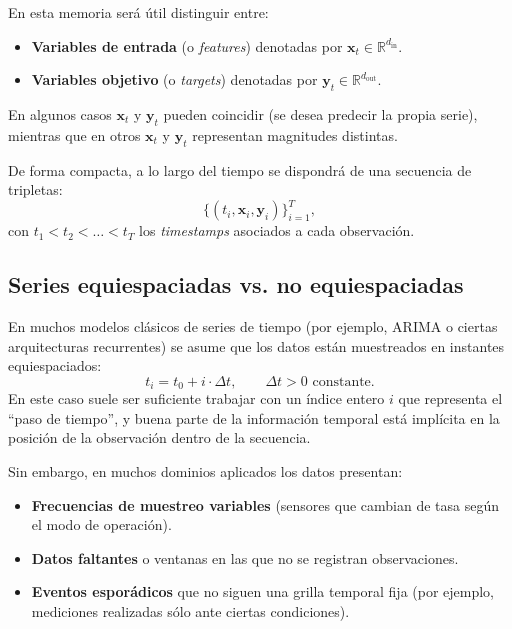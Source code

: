 \hfill

En esta memoria será útil distinguir entre:
\begin{itemize}
    \item \textbf{Variables de entrada} (o \emph{features}) denotadas por $\mathbf{x}_t \in \mathbb{R}^{d_{\text{in}}}$.
    \item \textbf{Variables objetivo} (o \emph{targets}) denotadas por $\mathbf{y}_t \in \mathbb{R}^{d_{\text{out}}}$.
\end{itemize}
En algunos casos $\mathbf{x}_t$ y $\mathbf{y}_t$ pueden coincidir (se desea predecir la propia serie), mientras que en otros $\mathbf{x}_t$ y $\mathbf{y}_t$ representan magnitudes distintas.

\hfill

De forma compacta, a lo largo del tiempo se dispondrá de una secuencia de tripletas:
\begin{equation}
    \{(t_i, \mathbf{x}_i, \mathbf{y}_i)\}_{i=1}^{T},
\end{equation}
con $t_1 < t_2 < \dots < t_T$ los \emph{timestamps} asociados a cada observación.

\subsection{Series equiespaciadas vs. no equiespaciadas}

En muchos modelos clásicos de series de tiempo (por ejemplo, ARIMA o ciertas arquitecturas recurrentes) se asume que los datos están muestreados en instantes equiespaciados:
\begin{equation}
    t_i = t_0 + i \cdot \Delta t, \qquad \Delta t > 0 \text{ constante}.
\end{equation}
En este caso suele ser suficiente trabajar con un índice entero $i$ que representa el ``paso de tiempo'', y buena parte de la información temporal está implícita en la posición de la observación dentro de la secuencia.

\hfill

Sin embargo, en muchos dominios aplicados los datos presentan:
\begin{itemize}
    \item \textbf{Frecuencias de muestreo variables} (sensores que cambian de tasa según el modo de operación).
    \item \textbf{Datos faltantes} o ventanas en las que no se registran observaciones.
    \item \textbf{Eventos esporádicos} que no siguen una grilla temporal fija (por ejemplo, mediciones realizadas sólo ante ciertas condiciones).
\end{itemize}

